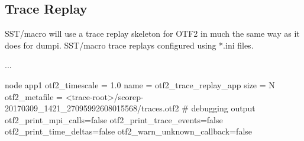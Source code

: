 \subsection{Trace Replay}
\label{subsec:otf:traceReplay}
SST/macro will use a trace replay skeleton for OTF2 in much the same way as it does for dumpi. SST/macro trace replays configured using *.ini files. 

\begin{ViFile}
...

node {
 app1 {
  otf2_timescale = 1.0
  name = otf2_trace_replay_app
  size = N
  otf2_metafile = <trace-root>/scorep-20170309_1421_27095992608015568/traces.otf2
 # debugging output
  otf2_print_mpi_calls=false
  otf2_print_trace_events=false
  otf2_print_time_deltas=false
  otf2_warn_unknown_callback=false
 }
}

\end{ViFile}
